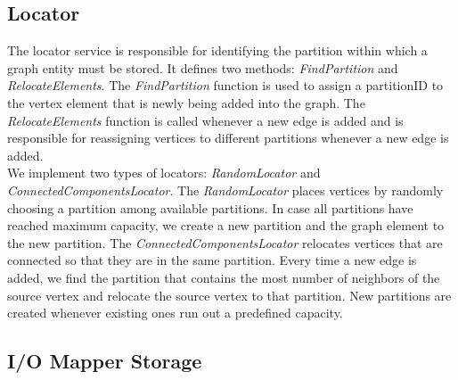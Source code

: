 \documentclass[letterpaper, 11 pt, conference]{ieeeconf}  %
\begin{document}
\subsection{Locator}
The locator service is responsible for identifying the partition within which a graph entity must be stored. It defines two methods: \textit{FindPartition} and \textit{RelocateElements}. The \textit{FindPartition} function is used to assign a partitionID to the vertex element that is newly being added into the graph. The \textit{RelocateElements} function is called whenever a new edge is added and is responsible for reassigning vertices to different partitions whenever a new edge is added.\\

We implement two types of locators: \textit{RandomLocator} and \textit{ConnectedComponentsLocator}. The \textit{RandomLocator} places vertices by randomly choosing a partition among available partitions. In case all partitions have reached maximum capacity, we create a new partition and the graph element to the new partition. The \textit{ConnectedComponentsLocator} relocates vertices that are connected so that they are in the same partition. Every time a new edge is added, we find the partition that contains the most number of neighbors of the source vertex and relocate the source vertex to that partition. New partitions are created whenever existing ones run out a predefined capacity.

\subsection{I/O Mapper Storage}
\end{document}
